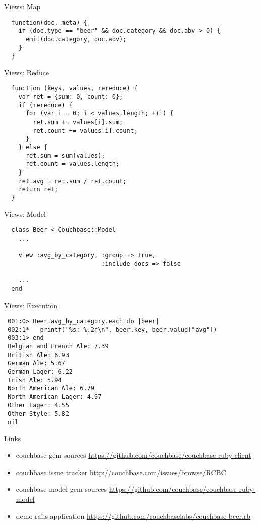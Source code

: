 \documentclass[aspectratio=43,handout]{beamer}
\begin{document}
\begin{frame}[fragile]{Views: Map}
  \begin{verbatim}
  function(doc, meta) {
    if (doc.type == "beer" && doc.category && doc.abv > 0) {
      emit(doc.category, doc.abv);
    }
  }
  \end{verbatim}
\end{frame}

\begin{frame}[fragile]{Views: Reduce}
  \begin{verbatim}
  function (keys, values, rereduce) {
    var ret = {sum: 0, count: 0};
    if (rereduce) {
      for (var i = 0; i < values.length; ++i) {
        ret.sum += values[i].sum;
        ret.count += values[i].count;
      }
    } else {
      ret.sum = sum(values);
      ret.count = values.length;
    }
    ret.avg = ret.sum / ret.count;
    return ret;
  }
  \end{verbatim}
\end{frame}

\begin{frame}[fragile]{Views: Model}
  \begin{verbatim}
  class Beer < Couchbase::Model
    ...

    view :avg_by_category, :group => true,
                           :include_docs => false

    ...
  end
  \end{verbatim}
\end{frame}

\begin{frame}[fragile]{Views: Execution}
  \begin{verbatim}
 001:0> Beer.avg_by_category.each do |beer|
 002:1*   printf("%s: %.2f\n", beer.key, beer.value["avg"])
 003:1> end
 Belgian and French Ale: 7.39
 British Ale: 6.93
 German Ale: 5.67
 German Lager: 6.22
 Irish Ale: 5.94
 North American Ale: 6.79
 North American Lager: 4.97
 Other Lager: 4.55
 Other Style: 5.82
 nil
  \end{verbatim}
\end{frame}

\begin{frame}[fragile]{Links}
  \begin{itemize}
    \item couchbase gem sources
      \url{https://github.com/couchbase/couchbase-ruby-client}
    \item couchbase issue tracker
      \url{http://couchbase.com/issues/browse/RCBC}
    \item couchbase-model gem sources
      \url{https://github.com/couchbase/couchbase-ruby-model}
    \item demo rails application
      \url{https://github.com/couchbaselabs/couchbase-beer.rb}
  \end{itemize}
\end{frame}
\end{document}
